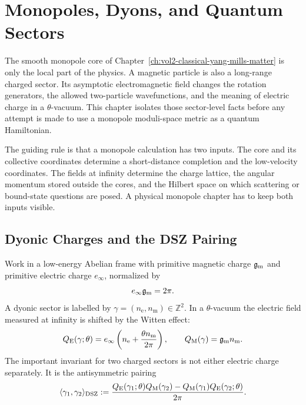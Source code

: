 \chapter{Monopoles, Dyons, and Quantum Sectors}
\label{ch:monopoles-dyons-quantum-sectors}
\ConventionsLorentzian

The smooth monopole core of
Chapter~\ref{ch:vol2-classical-yang-mills-matter} is only the local part of
the physics.  A magnetic particle is also a long-range charged sector.  Its
asymptotic electromagnetic field changes the rotation generators, the
allowed two-particle wavefunctions, and the meaning of electric charge in a
\(\theta\)-vacuum.  This chapter isolates those sector-level facts before
any attempt is made to use a monopole moduli-space metric as a quantum
Hamiltonian.

The guiding rule is that a monopole calculation has two inputs.  The core
and its collective coordinates determine a short-distance completion and the
low-velocity coordinates.  The fields at infinity determine the charge
lattice, the angular momentum stored outside the cores, and the Hilbert space
on which scattering or bound-state questions are posed.  A physical monopole
chapter has to keep both inputs visible.

\section{Dyonic Charges and the DSZ Pairing}
\label{sec:dyonic-charges-dsz-pairing}

Work in a low-energy Abelian frame with primitive magnetic charge
\(\mathfrak g_{\rm m}\) and primitive electric charge \(e_\infty\), normalized
by
\[
  e_\infty\mathfrak g_{\rm m}=2\pi .
\]
A dyonic sector is labelled by
\(\gamma=(n_{\mathrm e},n_{\mathrm m})\in\mathbb Z^2\).  In a
\(\theta\)-vacuum the electric field measured at infinity is shifted by the
Witten effect:
\begin{equation}
  Q_{\mathrm E}(\gamma;\theta)
  =
  e_\infty
  \left(
    n_{\mathrm e}
    +
    \frac{\theta n_{\mathrm m}}{2\pi}
  \right),
  \qquad
  Q_{\mathrm M}(\gamma)
  =
  \mathfrak g_{\rm m}n_{\mathrm m}.
  \label{eq:monopole-chapter-witten-shifted-charges}
\end{equation}
The important invariant for two charged sectors is not either electric
charge separately.  It is the antisymmetric pairing
\begin{equation}
  \langle\gamma_1,\gamma_2\rangle_{\rm DSZ}
  :=
  \frac{
    Q_{\mathrm E}(\gamma_1;\theta)Q_{\mathrm M}(\gamma_2)
    -
    Q_{\mathrm M}(\gamma_1)Q_{\mathrm E}(\gamma_2;\theta)
  }{2\pi}.
  \label{eq:monopole-chapter-dsz-physical-pairing}
\end{equation}

